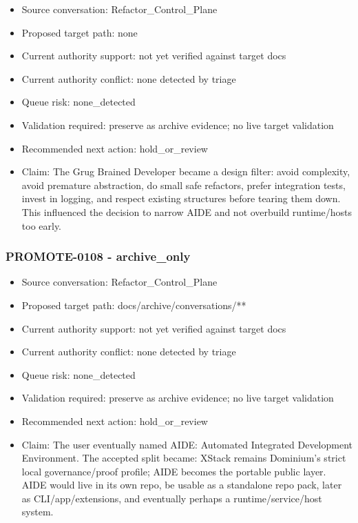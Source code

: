 \documentclass[11pt,a4paper]{report}
\begin{document}
\begin{itemize}
\item Source conversation: Refactor\_Control\_Plane
\item Proposed target path: none
\item Current authority support: not yet verified against target docs
\item Current authority conflict: none detected by triage
\item Queue risk: none\_detected
\item Validation required: preserve as archive evidence; no live target validation
\item Recommended next action: hold\_or\_review
\item Claim: The Grug Brained Developer became a design filter: avoid complexity, avoid premature abstraction, do small safe refactors, prefer integration tests, invest in logging, and respect existing structures before tearing them down. This influenced the decision to narrow AIDE and not overbuild runtime/hosts too early.
\end{itemize}

\subsubsection{PROMOTE-0108 - archive\_only}

\begin{itemize}
\item Source conversation: Refactor\_Control\_Plane
\item Proposed target path: docs/archive/conversations/**
\item Current authority support: not yet verified against target docs
\item Current authority conflict: none detected by triage
\item Queue risk: none\_detected
\item Validation required: preserve as archive evidence; no live target validation
\item Recommended next action: hold\_or\_review
\item Claim: The user eventually named AIDE: Automated Integrated Development Environment. The accepted split became: XStack remains Dominium's strict local governance/proof profile; AIDE becomes the portable public layer. AIDE would live in its own repo, be usable as a standalone repo pack, later as CLI/app/extensions, and eventually perhaps a runtime/service/host system.
\end{itemize}
\end{document}
